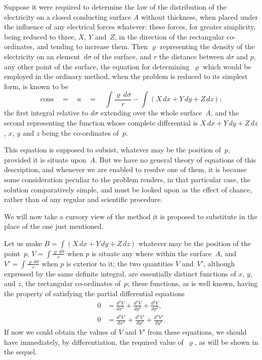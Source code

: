 \documentclass[11pt,notitlepage]{amsart}
\renewcommand{\rho}{\varrho}
\begin{document}
Suppose it were required to determine the law of the distribution of
the electricity on a closed conducting surface $A$ without thickness,
when placed
under the influence of any electrical forces whatever: these forces, for greater
simplicity, being reduced to three, $X$, $Y$ and~$Z$,
in the direction of the rectangular co-ordinates,
and tending to increase them. Then $\rho$ representing the
density of the electricity on an element~$d\sigma$ of the surface,
and $r$ the distance
between $d\sigma$ and $p$, any other point of the surface,
the equation for determining~$\rho$
which would be employed in the ordinary method, when the problem
is reduced to its simplest form, is known to be
\[
\tag{$a$}
\text{cons}\quad=\quad a\quad=\quad
\int\frac{\rho\,d\sigma}{r}-\int(X\,dx+Y\,dy+Z\,dz);
\]
the first integral relative to $d\sigma$
extending over the whole surface~$A$, and the second
representing the function whose complete differential is
${X\,dx+Y\,dy+Z\,dz}$, $x$, $y$ and $z$ being the co-ordinates of~$p$.

This equation is supposed to subsist, whatever may be the position of~$p$,
provided it is situate upon~$A$. But we have no general theory of equations
of this description, and whenever we are enabled to resolve one of them, it
is because some consideration peculiar to the problem renders, in that 
particular case, the solution comparatively simple,
and must be looked upon as the
effect of chance, rather than of any regular and scientific procedure.

We will now take a cursory view of the method it is proposed to
substitute in the place of the one just mentioned.

Let us make $B=\int(X\,dx+Y\,dy+Z\,dz)$ whatever may be the position
of the point~$p$, $V=\int\frac{\rho\,d\sigma}{r}$
when $p$ is situate any where within the surface~$A$,
and $V'=\int\frac{\rho\,d\sigma}{r}$ when $p$ is
exterior to it; the two quantities $V$ and~$V'$,
although expressed by the same definite integral,
are essentially distinct functions
of $x$, $y$, and $z$, the rectangular co-ordinates of~$p$;
these functions, as is well
known, having the property of satisfying the partial differential equations
\[
\begin{aligned}
0 &= \frac{d^2V}{dx^2}+\frac{d^2V}{dy^2}+\frac{d^2V}{dy^2},\\
0 &= \frac{d^2V'}{dx^2}+\frac{d^2V'}{dy^2}+\frac{d^2V'}{dy^2}.
\end{aligned}
\]
If now we could obtain the values of $V$ and $V'$ from these equations, we
should have immediately, by differentiation, the required value
of~$\rho$, as will
be shown in the sequel.
\end{document}
